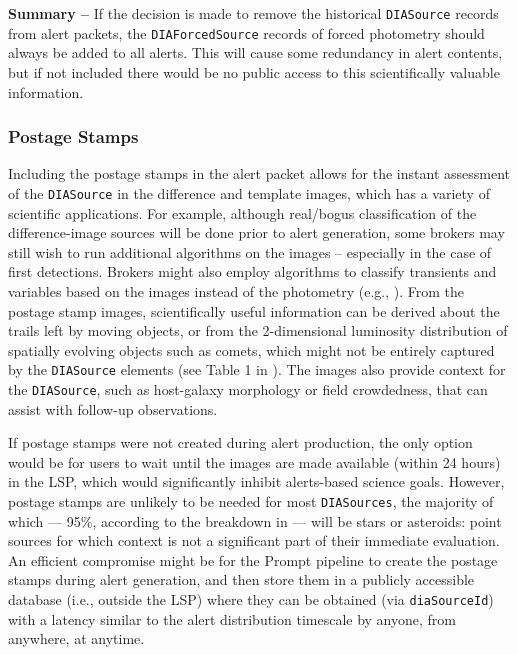 \documentclass[DM,lsstdraft,authoryear,toc]{lsstdoc}
\begin{document}
{\bf Summary --} If the decision is made to remove the historical {\tt DIASource} records from alert packets, the {\tt DIAForcedSource} records of forced photometry should always be added to all alerts. This will cause some redundancy in alert contents, but if not included there would be no public access to this scientifically valuable information.


\subsubsection{Postage Stamps}\label{sssec:packets_remove_stamps}

Including the postage stamps in the alert packet allows for the instant assessment of the {\tt DIASource} in the difference and template images, which has a variety of scientific applications. For example, although real/bogus classification of the difference-image sources will be done prior to alert generation, some brokers may still wish to run additional algorithms on the images -- especially in the case of first detections. Brokers might also employ algorithms to classify transients and variables based on the images instead of the photometry (e.g., \citealt{2019PASP..131j8006C}). From the postage stamp images, scientifically useful information can be derived about the trails left by moving objects, or from the 2-dimensional luminosity distribution of spatially evolving objects such as comets, which might not be entirely captured by the {\tt DIASource} elements (see Table 1 in ). The images also provide context for the {\tt DIASource}, such as host-galaxy morphology or field crowdedness, that can assist with follow-up observations.

If postage stamps were not created during alert production, the only option would be for users to wait until the images are made available (within 24 hours) in the LSP, which would significantly inhibit alerts-based science goals. However, postage stamps are unlikely to be needed for most {\tt DIASources}, the majority of which --- 95\%, according to the breakdown in  --- will be stars or asteroids: point sources for which context is not a significant part of their immediate evaluation. An efficient compromise might be for the Prompt pipeline to create the postage stamps during alert generation, and then store them in a publicly accessible database (i.e., outside the LSP) where they can be obtained (via {\tt diaSourceId}) with a latency similar to the alert distribution timescale by anyone, from anywhere, at anytime. 
\end{document}
